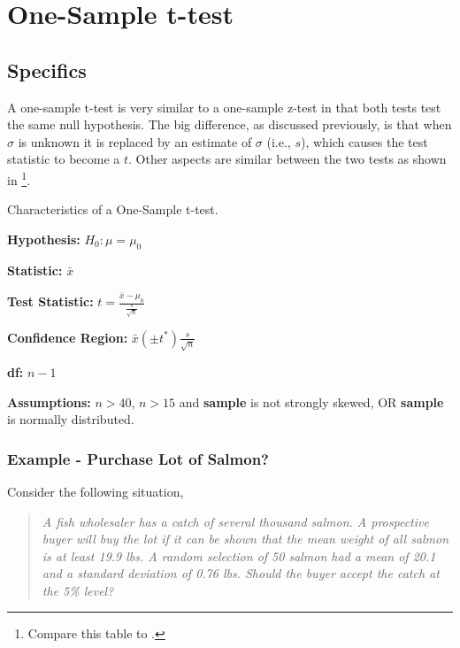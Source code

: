 \documentclass[10pt,openany]{book}\usepackage[]{graphicx}\usepackage[]{color}
\begin{document}
\vspace{-24pt}
\section{One-Sample t-test} \label{sect:t1test}
\subsection{Specifics}
A one-sample t-test is very similar to a one-sample z-test in that both tests test the same null hypothesis.  The big difference, as discussed previously, is that when $\sigma$ is unknown it is replaced by an estimate of $\sigma$ (i.e., $s$), which causes the test statistic to become a $t$.  Other aspects are similar between the two tests as shown in \footnote{Compare this table to .}.

\begin{table}[htbp]
  \caption{Characteristics of a One-Sample t-test.}
  \label{tab:1tspec}
    \begin{Itemize}
      \item \textbf{Hypothesis:} $H_{0}:\mu=\mu_{0}$
      \item \textbf{Statistic:} $\bar{x}$
      \item \textbf{Test Statistic:} $t=\frac{\bar{x}-\mu_{0}}{\frac{s}{\sqrt{n}}}$
      \item \textbf{Confidence Region:} $\bar{x}(\pm t^{*})\frac{s}{\sqrt{n}}$
      \item \textbf{df:} $n-1$
      \item \textbf{Assumptions:} $n>40$, $n>15$ and \textbf{sample} is not strongly skewed, OR \textbf{sample} is normally distributed.
    \end{Itemize}
\end{table}

\subsubsection{Example - Purchase Lot of Salmon?}
Consider the following situation,
\begin{quote}
\textsl{A fish wholesaler has a catch of several thousand salmon.  A prospective buyer will buy the lot if it can be shown that the mean weight of all salmon is at least 19.9 lbs.  A random selection of 50 salmon had a mean of 20.1 and a standard deviation of 0.76 lbs.  Should the buyer accept the catch at the 5\% level?}
\end{quote}
\end{document}
